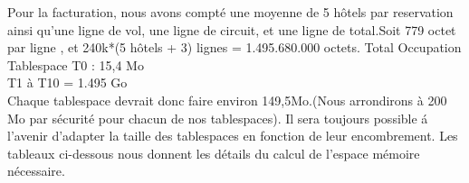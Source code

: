 Pour la facturation, nous avons compt\'e une moyenne de 5 h\^otels par reservation ainsi qu'une ligne de vol, une ligne de circuit, et une ligne de total.Soit 779 octet par ligne , et 240k*(5 h\^otels + 3) lignes = 1.495.680.000 octets.
Total Occupation Tablespace T0 : 15,4 Mo\\
T1 à T10 = 1.495 Go\\

Chaque tablespace devrait donc faire environ 149,5Mo.(Nous arrondirons \`a 200 Mo par s\'ecurit\'e pour chacun de nos tablespaces).
Il sera toujours possible \'a l'avenir d'adapter la taille des tablespaces en fonction de leur encombrement.
Les tableaux ci-dessous nous donnent les d\'etails du calcul de l'espace m\'emoire n\'ecessaire.

\newpage



